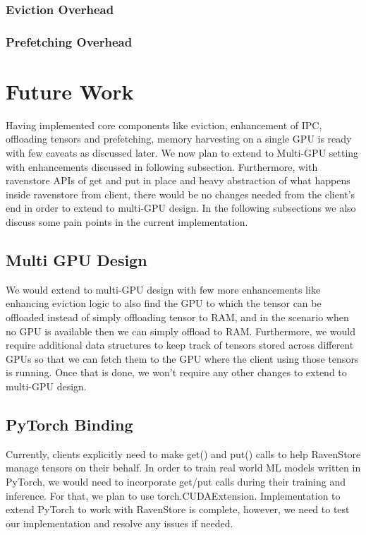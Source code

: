 \documentclass{article}
\begin{document}
\subsubsection{Eviction Overhead}
\subsubsection{Prefetching Overhead}

\section{Future Work}
Having implemented core components like eviction, enhancement of IPC, offloading tensors and prefetching, memory harvesting
on a single GPU is ready with few caveats as discussed later. We now plan
to extend to Multi-GPU setting with enhancements discussed in following subsection. 
Furthermore, with ravenstore APIs of get and put in place and heavy abstraction of what
happens inside ravenstore from client, there would be no changes needed from the client's end
in order to extend to multi-GPU design. In the following subsections we also discuss some pain points in the current implementation.

\subsection{Multi GPU Design}
We would extend to multi-GPU design with few more enhancements like enhancing 
eviction logic to also find the GPU to which the tensor can be offloaded instead
of simply offloading tensor to RAM, and in the scenario when no GPU is available
then we can simply offload to RAM. Furthermore, we would require additional data structures
to keep track of tensors stored across different GPUs so that we can fetch them to the GPU
where the client using those tensors is running. Once that is done, we won't require
any other changes to extend to multi-GPU design.

\subsection{PyTorch Binding}
Currently, clients explicitly need to make get() and put() calls to help RavenStore
manage tensors on their behalf. In order to train real world ML models written in PyTorch,
we would need to incorporate get/put calls during their training and inference. For that, we
plan to use torch.CUDAExtension. Implementation to extend PyTorch to work with RavenStore is complete,
however, we need to test our implementation and resolve any issues if needed.
\end{document}
